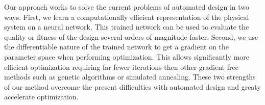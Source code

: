 \documentclass{article} %
\begin{document}

Our approach works to solve the current problems of automated design in two ways. First, we learn a computationally efficient representation of the physical system on a neural network. This trained network can be used to evaluate the quality or fitness of the design several orders of magnitude faster. Second, we use the differentiable nature of the trained network to get a gradient on the parameter space when performing optimization. This allows significantly more efficient optimization requiring far fewer iterations then other gradient free methods such as genetic algorithms or simulated annealing. These two strengths of our method overcome the present difficulties with automated design and greaty accelerate optimization.
\end{document}
